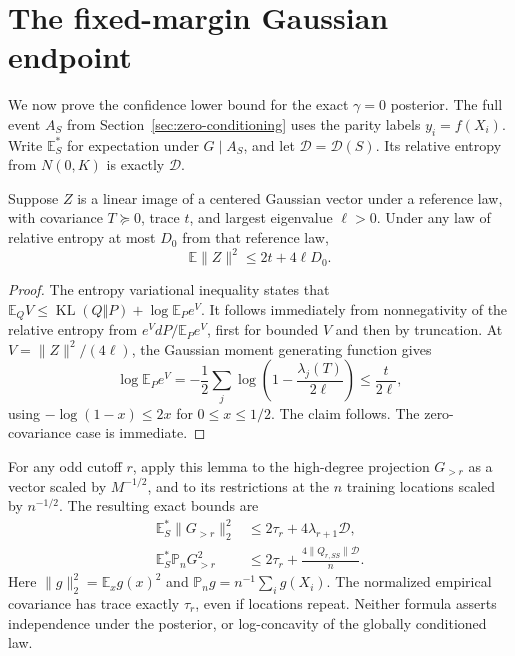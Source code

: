 \section{The fixed-margin Gaussian endpoint}
\label{sec:zero-endpoint}
We now prove the confidence lower bound for the exact $\gamma=0$
posterior. The full event $A_S$ from Section~\ref{sec:zero-conditioning}
uses the parity labels $y_i=f(X_i)$. Write $\mathbb E_S^*$ for expectation
under $G\mid A_S$, and let $\mathcal D=\mathcal D(S)$.
Its relative entropy from $N(0,K)$ is exactly $\mathcal D$.

\begin{lemma}\label{lem:zero-quadratic}
Suppose $Z$ is a linear image of a centered Gaussian vector under a
reference law, with covariance $T\succeq0$, trace $t$, and largest
eigenvalue $\ell>0$. Under any law of relative entropy at most $D_0$
from that reference law,
\[
 \mathbb E\|Z\|^2\le2t+4\ell D_0.
\]
\end{lemma}
\begin{proof}
The entropy variational inequality states that
$\mathbb E_Q V\le\operatorname{KL}(Q\Vert P)+\log\mathbb E_Pe^V$.
It follows immediately from nonnegativity of the relative entropy
from $e^VdP/\mathbb E_Pe^V$, first for bounded $V$ and then by
truncation. At $V=\|Z\|^2/(4\ell)$, the Gaussian moment generating
function gives
\[
 \log\mathbb E_Pe^V
 =-\frac12\sum_j\log\left(1-\frac{\lambda_j(T)}{2\ell}\right)
 \le\frac{t}{2\ell},
\]
using $-\log(1-x)\le2x$ for $0\le x\le1/2$. The claim follows.
The zero-covariance case is immediate.
\end{proof}

For any odd cutoff $r$, apply this lemma to the high-degree projection
$G_{>r}$ as a vector scaled by $M^{-1/2}$, and to its restrictions at
the $n$ training locations scaled by $n^{-1/2}$. The resulting exact
bounds are
\begin{align}
 \mathbb E_S^*\|G_{>r}\|_2^2
 &\le2\tau_r+4\lambda_{r+1}\mathcal D,
 \label{eq:zero-tail-population}\\
 \mathbb E_S^*\mathbb P_nG_{>r}^2
 &\le2\tau_r+\frac{4\|Q_{r,SS}\|\mathcal D}{n}.
 \label{eq:zero-tail-empirical}
\end{align}
Here $\|g\|_2^2=\mathbb E_xg(x)^2$ and
$\mathbb P_ng=n^{-1}\sum_i g(X_i)$. The normalized empirical covariance
has trace exactly $\tau_r$, even if locations repeat. Neither formula
asserts independence under the posterior, or log-concavity of the
globally conditioned law.

